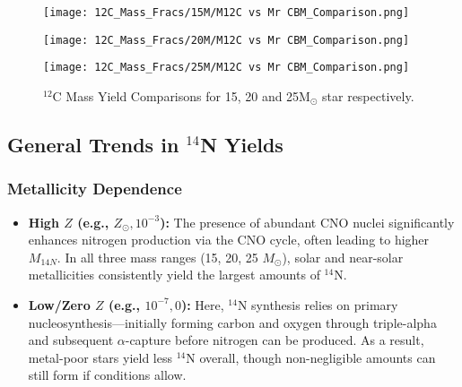 \begin{figure}
   \centering
   \begin{minipage}{0.7\textwidth}
      \centering
      \texttt{[image: 12C\_Mass\_Fracs/15M/M12C vs Mr CBM\_Comparison.png]}
      \label{fig:12C_15M_VCBM}
   \end{minipage}
   \vspace{-1em}
   
   \begin{minipage}{0.7\textwidth}
      \centering
      \texttt{[image: 12C\_Mass\_Fracs/20M/M12C vs Mr CBM\_Comparison.png]}
      \label{fig:12C_20M_VCBM}
   \end{minipage}
   \vspace{-1em}
   
   \begin{minipage}{0.7\textwidth}
      \centering
      \texttt{[image: 12C\_Mass\_Fracs/25M/M12C vs Mr CBM\_Comparison.png]}
      \label{fig:12C_25M_VCBM}
   \end{minipage}
   \vspace{-1em}

   \caption{ \(^{12}\)C Mass Yield Comparisons for 15, 20 and 25M\(_\odot\) star respectively.}
   \label{fig:15M_yield_comparison}
\end{figure}

\clearpage
\subsection{General Trends in $^{14}$N Yields}

\subsubsection{Metallicity Dependence}  
\begin{itemize}
    \item \textbf{High $Z$ (e.g., $Z_\odot, 10^{-3}$):} 
    The presence of abundant CNO nuclei significantly enhances nitrogen production via the CNO cycle, often leading to higher $M_{14N}$. In all three mass ranges (15, 20, 25 $M_\odot$), solar and near-solar metallicities consistently yield the largest amounts of $^{14}$N.
    \item \textbf{Low/Zero $Z$ (e.g., $10^{-7}, 0$):} 
    Here, $^{14}$N synthesis relies on primary nucleosynthesis—initially forming carbon and oxygen through triple-alpha and subsequent $\alpha$-capture before nitrogen can be produced. As a result, metal-poor stars yield less $^{14}$N overall, though non-negligible amounts can still form if conditions allow.
\end{itemize}

